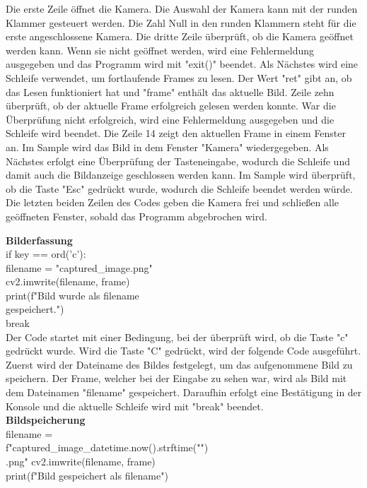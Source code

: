 {Die erste Zeile öffnet die Kamera. Die Auswahl der Kamera kann mit der runden Klammer gesteuert werden. Die Zahl Null in den runden Klammern steht für die erste angeschlossene Kamera. Die dritte Zeile überprüft, ob die Kamera geöffnet werden kann. Wenn sie nicht geöffnet werden, wird eine Fehlermeldung ausgegeben und das Programm wird mit "exit()" beendet. Als Nächstes wird eine Schleife verwendet, um fortlaufende Frames zu lesen. Der Wert "ret" gibt an, ob das Lesen funktioniert hat und "frame" enthält das aktuelle Bild. Zeile zehn überprüft, ob der aktuelle Frame erfolgreich gelesen werden konnte. War die Überprüfung nicht erfolgreich, wird eine Fehlermeldung ausgegeben und die Schleife wird beendet. Die Zeile 14 zeigt den aktuellen Frame in einem Fenster an. Im Sample wird das Bild in dem Fenster "Kamera" wiedergegeben. Als Nächstes erfolgt eine Überprüfung der Tasteneingabe, wodurch die Schleife und damit auch die Bildanzeige geschlossen werden kann. Im Sample wird überprüft, ob die Taste "Esc" gedrückt wurde, wodurch die Schleife beendet werden würde. Die letzten beiden Zeilen des Codes geben die Kamera frei und schließen alle geöffneten Fenster, sobald das Programm abgebrochen wird.\\
\newpage

\textbf{Bilderfassung}\\

if key == ord('c'):  \\
filename = "captured\_image.png" \\
cv2.imwrite(filename, frame) \\
print(f"Bild wurde als {filename} \\ gespeichert.")            \\
break\\


Der Code startet mit einer Bedingung, bei der überprüft wird, ob die Taste "c" gedrückt wurde.
Wird die Taste "C" gedrückt, wird der folgende Code ausgeführt. Zuerst wird der Dateiname des Bildes festgelegt, um das aufgenommene Bild zu speichern. Der Frame, welcher bei der Eingabe zu sehen war, wird als Bild mit dem Dateinamen "filename" gespeichert. Daraufhin erfolgt eine Bestätigung in der Konsole und die aktuelle Schleife wird mit "break" beendet.\\

\textbf{Bildspeicherung}\\

filename =\\ f"captured\_image\_{datetime.now().strftime("")}\\.png" 
cv2.imwrite(filename, frame)\\
print(f"Bild gespeichert als {filename}")\\


}
